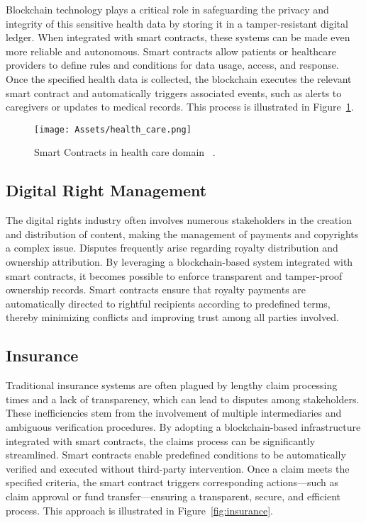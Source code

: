 Blockchain technology plays a critical role in safeguarding the privacy and integrity of this sensitive health data by storing it in a tamper-resistant digital ledger. When integrated with smart contracts, these systems can be made even more reliable and autonomous. Smart contracts allow patients or healthcare providers to define rules and conditions for data usage, access, and response. Once the specified health data is collected, the blockchain executes the relevant smart contract and automatically triggers associated events, such as alerts to caregivers or updates to medical records. This process is illustrated in Figure~\ref{fig:health_care}.
\begin{figure}[H]
    \centering
    \texttt{[image: Assets/health\_care.png]}
    \caption{Smart Contracts in health care domain ~\cite{zhang2020scvd}.}
    \label{fig:health_care}
\end{figure}


\subsection{Digital Right Management}
The digital rights industry often involves numerous stakeholders in the creation and distribution of content, making the management of payments and copyrights a complex issue. Disputes frequently arise regarding royalty distribution and ownership attribution. By leveraging a blockchain-based system integrated with smart contracts, it becomes possible to enforce transparent and tamper-proof ownership records. Smart contracts ensure that royalty payments are automatically directed to rightful recipients according to predefined terms, thereby minimizing conflicts and improving trust among all parties involved.

\subsection{Insurance}
Traditional insurance systems are often plagued by lengthy claim processing times and a lack of transparency, which can lead to disputes among stakeholders. These inefficiencies stem from the involvement of multiple intermediaries and ambiguous verification procedures. By adopting a blockchain-based infrastructure integrated with smart contracts, the claims process can be significantly streamlined. Smart contracts enable predefined conditions to be automatically verified and executed without third-party intervention. Once a claim meets the specified criteria, the smart contract triggers corresponding actions—such as claim approval or fund transfer—ensuring a transparent, secure, and efficient process. This approach is illustrated in Figure~\ref{fig:insurance}.

